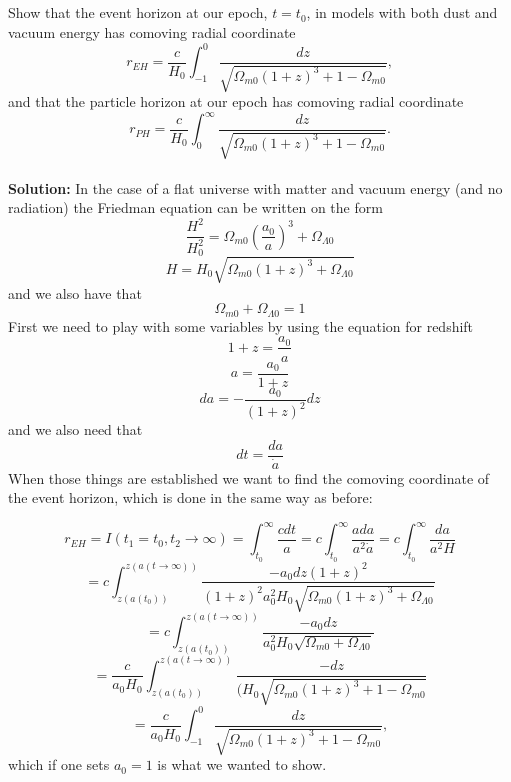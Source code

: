 \documentclass[a4paper,12pt]{article}
\begin{document}
\subsection{}
Show that the event horizon at our epoch, $t= t_0$, in models with both dust and vacuum energy has comoving radial coordinate
\begin{equation}
r_{EH} = \frac{c}{H_0}\int_{-1}^{0}\frac{dz}{\sqrt{\Omega_{m0}(1+z)^3+1-\Omega_{m0}}},
\end{equation}
and that the particle horizon at our epoch has comoving radial coordinate
\begin{equation}
r_{PH} = \frac{c}{H_0}\int_{0}^{\infty}\frac{dz}{\sqrt{\Omega_{m0}(1+z)^3+1-\Omega_{m0}}}.
\end{equation}
\\
\textbf{Solution:}
In the case of a flat universe with matter and vacuum energy (and no radiation) the Friedman equation can be written on the form 
$$\frac{H^2}{H_0^2} = \Omega_{m0}(\frac{a_0}{a})^3+\Omega_{\Lambda0}$$
\begin{equation}
H = H_0\sqrt{\Omega_{m0}(1+z)^3+\Omega_{\Lambda0}}
\end{equation}
and we also have that
\begin{equation}
\Omega_{m0} + \Omega_{\Lambda0} = 1
\end{equation}
First we need to play with some variables by using the equation for redshift
$$1 + z = \frac{a_0}{a}$$
$$ a =  \frac{a_0}{1+z}$$
\begin{equation}
da = -\frac{a_0}{(1+z)^2}dz
\end{equation}
and we also need that
\begin{equation}
dt = \frac{da}{\dot{a}}
\end{equation}
When those things are established we want to find the comoving coordinate of the event horizon, which is done in the same way as before:

$$r_{EH} = I(t_1=t_0,t_2\to\infty)=\int_{t_0}^{\infty}\frac{cdt}{a} = c\int_{t_0}^{\infty}\frac{ada}{a^2\dot{a}} = c\int_{t_0}^{\infty}\frac{da}{a^2H}$$
$$=c\int_{z(a(t_0))}^{z(a(t\to\infty))}\frac{-a_0dz(1+z)^2}{(1+z)^2a_0^2H_0\sqrt{\Omega_{m0}(1+z)^3+\Omega_{\Lambda0}}}$$
$$=c\int_{z(a(t_0))}^{z(a(t\to\infty))}\frac{-a_0dz}{a_0^2H_0\sqrt{\Omega_{m0}+\Omega_{\Lambda0}}}$$
$$=\frac{c}{a_0H_0}\int_{z(a(t_0))}^{z(a(t\to\infty))}\frac{-dz}{(H_0\sqrt{\Omega_{m0}(1+z)^3+ 1-\Omega_{m0}}}$$
$$=\frac{c}{a_0H_0}\int_{-1}^{0}\frac{dz}{\sqrt{\Omega_{m0}(1+z)^3 + 1-\Omega_{m0}}},$$ which if one sets $a_0 = 1$ is what we wanted to show.
\end{document}
